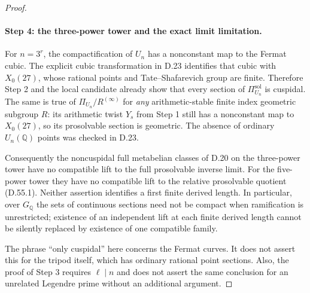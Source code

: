 \begin{proof}
\paragraph{Step 4: the three-power tower and the exact limit limitation.}

For $n=3^r$, the compactification of $U_n$ has a nonconstant map
to the Fermat cubic.  The explicit cubic transformation in D.23
identifies that cubic with $X_0(27)$, whose rational points and
Tate--Shafarevich group are finite.  Therefore Step 2 and the
local candidate already show that every section of
$\Pi_{U_n}^{\mathrm{sol}}$ is cuspidal.  The same is true of
$\Pi_{U_n}/R^{(\infty)}$ for \emph{any} arithmetic-stable finite
index geometric subgroup $R$: its arithmetic twist $Y_s$ from
Step 1 still has a nonconstant map to $X_0(27)$, so its
prosolvable section is geometric.  The absence of ordinary
$U_n(\mathbb Q)$ points was checked in D.23.

Consequently the noncuspidal full metabelian classes of D.20 on
the three-power tower have no compatible lift to the full
prosolvable inverse limit.  For the five-power tower they have no
compatible lift to the relative prosolvable quotient (D.55.1).
Neither assertion identifies a first finite derived length.
In particular, over $G_{\mathbb Q}$ the sets of continuous sections
need not be compact when ramification is unrestricted; existence
of an independent lift at each finite derived length cannot be
silently replaced by existence of one compatible family.

The phrase ``only cuspidal'' here concerns the Fermat curves.
It does not assert this for the tripod itself, which has ordinary
rational point sections.  Also, the proof of Step 3 requires
$\ell\mid n$ and does not assert the same conclusion for an
unrelated Legendre prime without an additional argument.

\end{proof}
